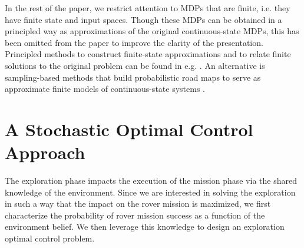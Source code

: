 \documentclass[conference]{IEEEtran}
\renewcommand{\cite}[1]{\citep{#1}}
\begin{document}

In the rest of the paper, we restrict attention to MDPs that are finite, i.e. they have finite state and input spaces. Though these MDPs can be obtained in a principled way as approximations of the original continuous-state MDPs, this has been omitted from the paper to improve the clarity of the presentation. Principled methods to construct finite-state approximations and to relate finite solutions to the original problem can be found in e.g. \cite{Zamani2015,Haesaert2017}. An alternative is sampling-based methods that build probabilistic road maps to serve as approximate finite models of continuous-state systems \cite{Kavraki1996, Agha-mohammadi2014}.


\section{A Stochastic Optimal Control Approach}
\label{sec:stochopt}


The exploration phase impacts the execution of the mission phase via the shared knowledge of the environment. Since we are interested in solving the exploration in such a way that the impact on the rover mission is maximized, we first characterize the probability of rover mission success as a function of the environment belief. We then leverage this knowledge to design an exploration optimal control problem.
\end{document}
